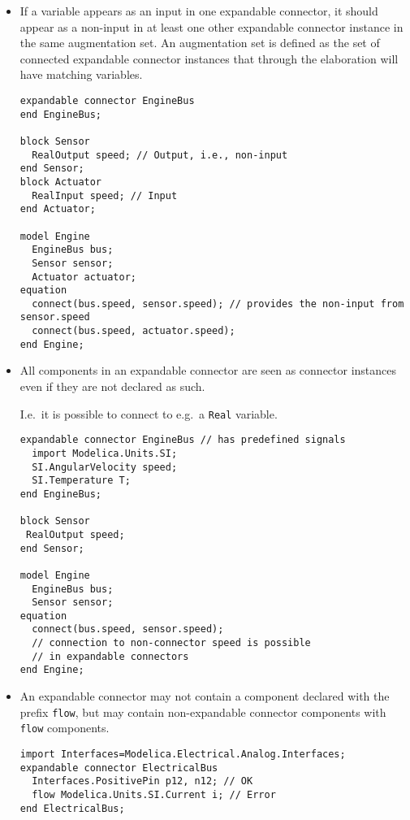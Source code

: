\begin{itemize}
\item
  If a variable appears as an input in one expandable connector, it
  should appear as a non-input in at least one other expandable
  connector instance in the same augmentation set. An augmentation set
  is defined as the set of connected expandable connector instances that
  through the elaboration will have matching variables.
\begin{example}
\begin{lstlisting}[language=modelica]
expandable connector EngineBus
end EngineBus;

block Sensor
  RealOutput speed; // Output, i.e., non-input
end Sensor;
block Actuator
  RealInput speed; // Input
end Actuator;

model Engine
  EngineBus bus;
  Sensor sensor;
  Actuator actuator;
equation
  connect(bus.speed, sensor.speed); // provides the non-input from sensor.speed
  connect(bus.speed, actuator.speed);
end Engine;
\end{lstlisting}
\end{example}

\item
  All components in an expandable connector are seen as connector
  instances even if they are not declared as such.
  \begin{nonnormative}
  I.e.\ it is possible to connect to e.g.\ a \lstinline!Real! variable.
  \end{nonnormative}
\begin{example}
\begin{lstlisting}[language=modelica]
expandable connector EngineBus // has predefined signals
  import Modelica.Units.SI;
  SI.AngularVelocity speed;
  SI.Temperature T;
end EngineBus;

block Sensor
 RealOutput speed;
end Sensor;

model Engine
  EngineBus bus;
  Sensor sensor;
equation
  connect(bus.speed, sensor.speed);
  // connection to non-connector speed is possible
  // in expandable connectors
end Engine;
\end{lstlisting}
\end{example}

\item
  An expandable connector may not contain a component declared with the
  prefix \lstinline!flow!, but may contain non-expandable connector components with
  \lstinline!flow! components.
\begin{example}
\begin{lstlisting}[language=modelica]
import Interfaces=Modelica.Electrical.Analog.Interfaces;
expandable connector ElectricalBus
  Interfaces.PositivePin p12, n12; // OK
  flow Modelica.Units.SI.Current i; // Error
end ElectricalBus;


\end{lstlisting}
\end{example}
\end{itemize}
